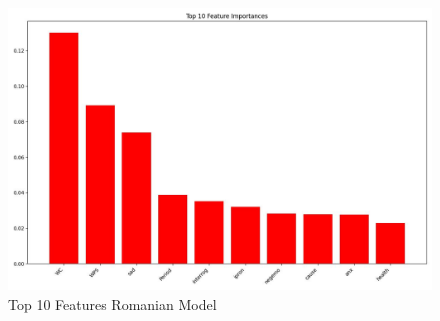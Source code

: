 \begin{figure}[htbp]
	\centering
		\includegraphics[scale=0.5]{LaTeX Bachelor Thesis Depression Signs Detection/figures/metrics/experimentRomanian/top10features.jpg}
	\caption{Top 10 Features Romanian Model}
	\label{top10FeaturesRomanianExperiment}
\end{figure}